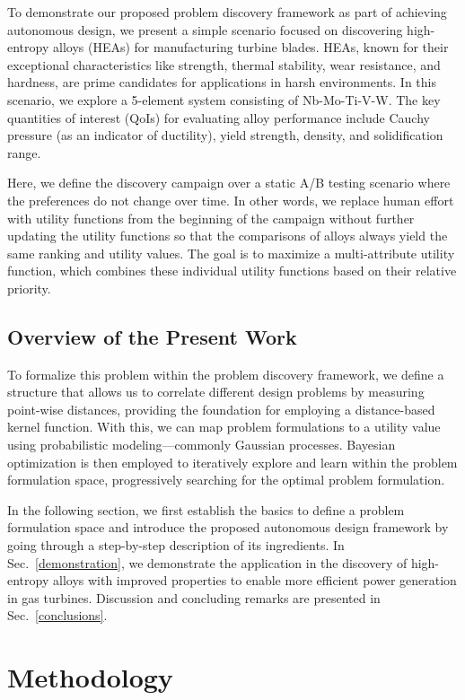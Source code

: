 \documentclass[final,5p,times,twocolumn]{elsarticle}
\begin{document}
To demonstrate our proposed problem discovery framework as part of achieving autonomous design, we present a simple scenario focused on discovering high-entropy alloys (HEAs) for manufacturing turbine blades. HEAs, known for their exceptional characteristics like strength, thermal stability, wear resistance, and hardness, are prime candidates for applications in harsh environments. In this scenario, we explore a 5-element system consisting of Nb-Mo-Ti-V-W. The key quantities of interest (QoIs) for evaluating alloy performance include Cauchy pressure (as an indicator of ductility), yield strength, density, and solidification range.

Here, we define the discovery campaign over a static A/B testing scenario where the preferences do not change over time. In other words, we replace human effort with utility functions from the beginning of the campaign without further updating the utility functions so that the comparisons of alloys always yield the same ranking and utility values. The goal is to maximize a multi-attribute utility function, which combines these individual utility functions based on their relative priority.

\subsection{Overview of the Present Work}
To formalize this problem within the problem discovery framework, we define a structure that allows us to correlate different design problems by measuring point-wise distances, providing the foundation for employing a distance-based kernel function. With this, we can map problem formulations to a utility value using probabilistic modeling---commonly Gaussian processes. Bayesian optimization is then employed to iteratively explore and learn within the problem formulation space, progressively searching for the optimal problem formulation.

In the following section, we first establish the basics to define a problem formulation space and introduce the proposed autonomous design framework by going through a step-by-step description of its ingredients. In Sec.~\ref{demonstration}, we demonstrate the application in the discovery of high-entropy alloys with improved properties to enable more efficient power generation in gas turbines. Discussion and concluding remarks are presented in Sec.~\ref{conclusions}.

\section{Methodology}
\label{Methodology}
\end{document}
